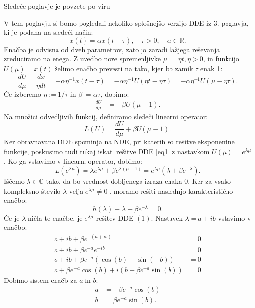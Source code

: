 \documentclass[12pt,a4paper]{amsart}
\theoremstyle{definition} %
\theoremstyle{plain} %
\newcommand{\R}{\mathbb R}
\newcommand{\C}{\mathbb C}
\begin{document}
Sledeče poglavje je povzeto po viru \cite{angdiploma}.

V tem poglavju si bomo pogledali nekoliko splošnejšo verzijo DDE iz 3. poglavja, ki je podana na sledeči način:
\[\dot{x}(t)= \alpha x(t-\tau), \quad \tau > 0,\quad \alpha \in \R.\]
Enačba je odvisna od dveh parametrov, zato jo zaradi lažjega reševanja zreduciramo na enega.
Z uvedbo nove spremenljivke $\mu:=\eta t, \eta > 0$, in funkcijo
$U(\mu)=x(t)$ želimo enačbo prevesti na tako, kjer bo zamik $\tau$ enak 1:
\[\frac{dU}{d\mu}=\frac{dx}{\eta dt}=-\alpha \eta^{-1}x(t-\tau)=-\alpha \eta^{-1}U(\eta t - \eta \tau)=
-\alpha \eta^{-1}U(\mu - \eta \tau).\]
Če izberemo $\eta := 1/\tau$ in $\beta:=\alpha \tau$, dobimo:
\begin{equation} \label{eq1}
    \begin{split}
 \frac{dU}{d\mu} & =-\beta U(\mu -1).
    \end{split}
\end{equation}
Na množici odvedljivih funkcij, definiramo sledeči linearni operator:
\[L(U)=\frac{dU}{d\mu} + \beta U(\mu -1).\]
Ker obravnavana DDE spominja na NDE, pri katerih so rešitve eksponentne funkcije, poskusimo tudi tukaj
iskati rešitve DDE \eqref{eq1} z nastavkom $U(\mu)=e^{\lambda \mu}$. Ko ga vstavimo v linearni operator,
dobimo:
\[L(e^{\lambda \mu})= \lambda e^{\lambda \mu} + \beta e^{\lambda (\mu -1)}=
e^{\lambda \mu}(\lambda + \beta e^{-\lambda}).\]
Iščemo $\lambda \in \C$ tako, da bo vrednost dobljenega izraza enaka 0. Ker
za vsako kompleksno število $\lambda$ velja $e^{\lambda \mu} \neq 0$ , moramo rešiti naslednjo karakteristično
enačbo:
\[ h(\lambda) \equiv \lambda + \beta e^{-\lambda} =0.\]
Če je $\lambda$ ničla te enačbe, je $e^{\lambda\mu}$ rešitev DDE $(1)$.
Nastavek $\lambda = a + ib$ vstavimo v enačbo:
\begin{equation*}
    \begin{split}
        a + ib + \beta e^{-(a+ib)} &= 0 \\
        a + ib + \beta e^{-a}e^{-ib} &= 0 \\
        a + ib + \beta e^{-a}(\cos(b) + \sin(-b)) &= 0 \\
        a + \beta e^{-a}\cos(b) + i(b-\beta e^{-a}\sin(b)) &= 0
    \end{split}      
\end{equation*}
Dobimo sistem enačb za $a$ in $b$:
\begin{equation*}
    \begin{split}
        a &= -\beta e^{-a}\cos(b) \\
        b &= \beta e^{-a}\sin(b).
    \end{split}      
\end{equation*}
\end{document}
